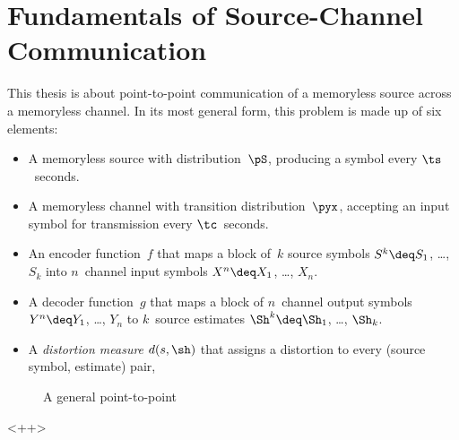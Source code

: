 \chapter{Fundamentals of Source-Channel Communication}

This thesis is about point-to-point communication of a memoryless source across
a memoryless channel. In its most general form, this problem is made up of six
elements:
\begin{itemize}
  \item A memoryless source with distribution~$\pS$, producing a symbol every
    $\ts$~seconds.
  \item A memoryless channel with transition distribution~$\pyx$, accepting an
    input symbol for transmission every $\tc$~seconds.
  \item An encoder function~$f$ that maps a block of~$k$ source symbols $S^k
    \deq S_1$, \dots, $S_k$ into $n$~channel input symbols $X^n \deq X_1$,
    \dots, $X_n$.
  \item A decoder function~$g$ that maps a block of $n$~channel output symbols
    $Y^n \deq Y_1$, \dots, $Y_n$ to $k$~source estimates $\Sh^k \deq \Sh_1$,
    \dots, $\Sh_k$.
  \item A \emph{distortion measure} $d(s,\sh)$ that assigns a distortion to
    every (source symbol, estimate) pair, 
\end{itemize}


\begin{figure}
  \begin{center}
    
  \end{center}
  \caption{A general point-to-point }
  \label{fig:<+label+>}
\end{figure}<++>
